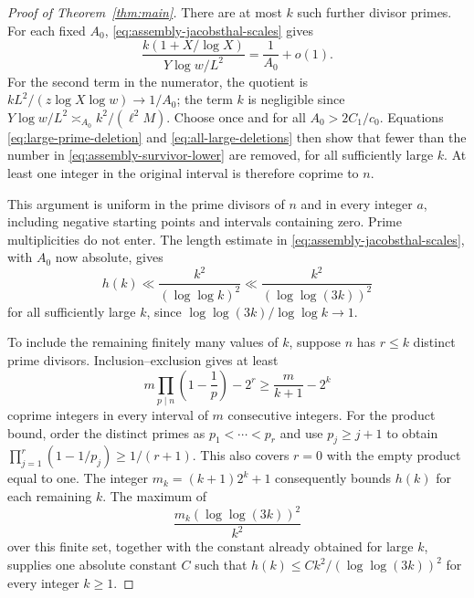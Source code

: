 \begin{proof}[Proof of Theorem~\ref{thm:main}]
There are at most $k$ such further divisor primes.  For each fixed
$A_0$, \eqref{eq:assembly-jacobsthal-scales} gives
\begin{equation}\label{eq:all-large-deletions}
 \frac{k(1+X/\log X)}{Y\log w/L^2}
 =\frac1{A_0}+o(1).
\end{equation}
For the second term in the numerator, the quotient is
$kL^2/(z\log X\log w)\to1/A_0$; the term $k$ is negligible since
$Y\log w/L^2\asymp_{A_0}k^2/(\ell^2M)$.
Choose once and for all $A_0>2C_1/c_0$.  Equations
\eqref{eq:large-prime-deletion} and \eqref{eq:all-large-deletions}
then show that fewer than the number in
\eqref{eq:assembly-survivor-lower} are removed, for all sufficiently
large $k$.  At least one integer in the original interval is therefore
coprime to $n$.

This argument is uniform in the prime divisors of $n$ and in every
integer $a$, including negative starting points and intervals containing
zero.  Prime multiplicities do not enter.  The length estimate in
\eqref{eq:assembly-jacobsthal-scales}, with $A_0$ now absolute, gives
\[
 h(k)\ll\frac{k^2}{(\log\log k)^2}
       \ll\frac{k^2}{(\log\log(3k))^2}
\]
for all sufficiently large $k$, since
$\log\log(3k)/\log\log k\to1$.

To include the remaining finitely many values of $k$, suppose $n$ has
$r\le k$ distinct prime divisors.  Inclusion--exclusion gives at least
\[
 m\prod_{p\mid n}\left(1-\frac1p\right)-2^r
 \ge\frac m{k+1}-2^k
\]
coprime integers in every interval of $m$ consecutive integers.
For the product bound, order the distinct primes as
$p_1<\cdots<p_r$ and use $p_j\ge j+1$ to obtain
$\prod_{j=1}^r(1-1/p_j)\ge1/(r+1)$.  This also covers $r=0$
with the empty product equal to one.  The integer
$m_k=(k+1)2^k+1$ consequently bounds $h(k)$ for each remaining $k$.
The maximum of
\[
 \frac{m_k(\log\log(3k))^2}{k^2}
\]
over this finite set, together with the constant already obtained for
large $k$, supplies one absolute constant $C$ such that
$h(k)\le Ck^2/(\log\log(3k))^2$ for every integer $k\ge1$.
\end{proof}

